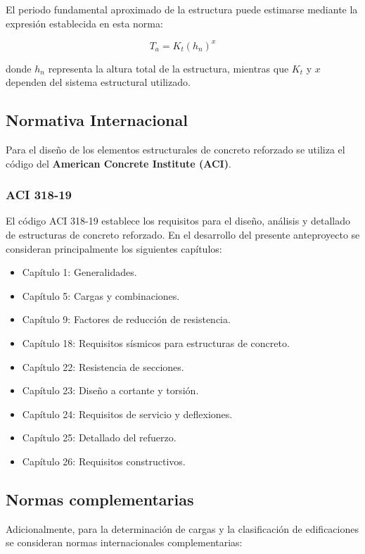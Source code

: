 \documentclass[14pt,letterpaper]{extarticle}
\begin{document}
	El periodo fundamental aproximado de la estructura puede estimarse mediante la expresión establecida en esta norma:
	
	\[
	T_a = K_t (h_n)^x
	\]
	
	donde $h_n$ representa la altura total de la estructura, mientras que $K_t$ y $x$ dependen del sistema estructural utilizado.
	
	\subsection{Normativa Internacional}
	
	Para el diseño de los elementos estructurales de concreto reforzado se utiliza el código del \textbf{American Concrete Institute (ACI)}.
	
	\subsubsection{ACI 318-19}
	
	El código ACI 318-19 establece los requisitos para el diseño, análisis y detallado de estructuras de concreto reforzado. En el desarrollo del presente anteproyecto se consideran principalmente los siguientes capítulos:
	
	\begin{itemize}
		\item Capítulo 1: Generalidades.
		\item Capítulo 5: Cargas y combinaciones.
		\item Capítulo 9: Factores de reducción de resistencia.
		\item Capítulo 18: Requisitos sísmicos para estructuras de concreto.
		\item Capítulo 22: Resistencia de secciones.
		\item Capítulo 23: Diseño a cortante y torsión.
		\item Capítulo 24: Requisitos de servicio y deflexiones.
		\item Capítulo 25: Detallado del refuerzo.
		\item Capítulo 26: Requisitos constructivos.
	\end{itemize}
	
	\subsection{Normas complementarias}
	
	Adicionalmente, para la determinación de cargas y la clasificación de edificaciones se consideran normas internacionales complementarias:
	
\end{document}
